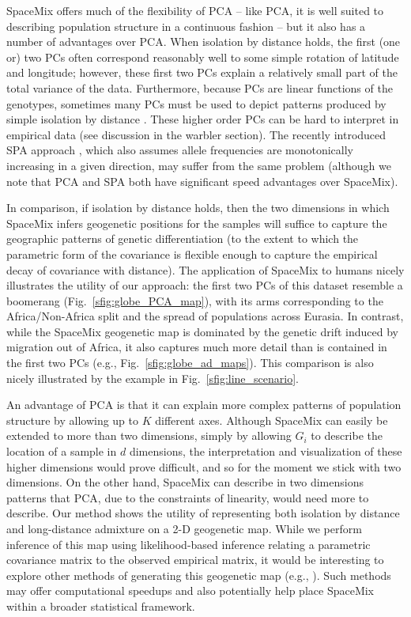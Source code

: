 \documentclass[10pt,letterpaper]{article}
\begin{document}
SpaceMix offers much of the flexibility of PCA -- like PCA, it is well suited to describing population structure in a continuous fashion --
but it also has a number of advantages over PCA. 
When isolation by distance holds, the first (one or) two PCs often correspond reasonably well to some simple rotation of latitude and longitude; 
however, these first two PCs explain a relatively small part of the total variance of the data. 
Furthermore, because PCs are linear functions of the genotypes,
sometimes many PCs must be used to depict patterns produced by simple isolation by distance \cite{novembre_interpreting_2008}. 
These higher order PCs can be hard to interpret in empirical data (see discussion in the warbler section).
The recently introduced SPA approach \cite{yang_model-based_2012},
which also assumes allele frequencies are monotonically increasing in a given direction,
may suffer from the same problem
(although we note that PCA and SPA both have significant speed advantages over SpaceMix).  

In comparison, if isolation by distance holds, then the two dimensions in which SpaceMix infers geogenetic positions 
for the samples will suffice to capture the geographic patterns of genetic differentiation 
(to the extent to which the parametric form of the covariance is flexible enough to capture the empirical decay of covariance with distance). 
The application of SpaceMix to humans nicely illustrates the utility of our approach: 
the first two PCs of this dataset resemble a boomerang (Fig.\ \ref{sfig:globe_PCA_map}), 
with its arms corresponding to the Africa/Non-Africa split and the spread of populations across Eurasia. 
In contrast, while the SpaceMix geogenetic map is dominated by the genetic drift induced by migration out of Africa,
it also captures much more detail than is contained in the first two PCs (e.g., Fig.\ \ref{sfig:globe_ad_maps}).
This comparison is also nicely illustrated by the example in Fig.\ \ref{sfig:line_scenario}.

An advantage of PCA is that it can explain more complex patterns of population structure by allowing up to $K$ different axes.
Although SpaceMix can easily be extended to more than two dimensions, 
simply by allowing $G_i$ to describe the location of a sample in $d$ dimensions, 
the interpretation and visualization of these higher dimensions would prove difficult, 
and so for the moment we stick with two dimensions.
On the other hand, SpaceMix can describe in two dimensions patterns that PCA,
due to the constraints of linearity, would need more to describe.
Our method shows the utility of representing both isolation by distance and 
long-distance admixture on a 2-D geogenetic map.  
While we perform inference of this map using likelihood-based inference 
relating a parametric covariance matrix to the observed empirical matrix, 
it would be interesting to explore other methods of generating this geogenetic map 
(e.g., \cite{Bookstein_1989,Sampson_Guttorp_1992,yang_model-based_2012,Petkova_2014_EEMS}).  
Such methods may offer computational speedups 
and also potentially help place SpaceMix within a broader statistical framework.
\end{document}

